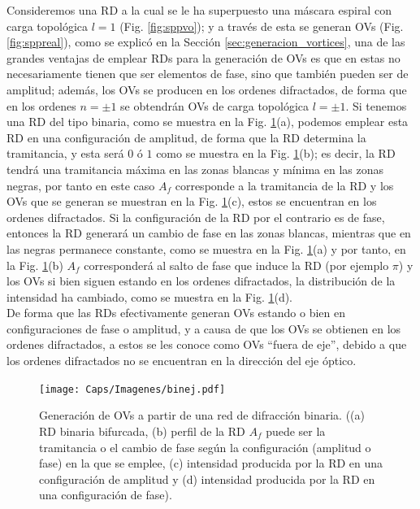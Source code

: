 Consideremos una RD a la cual se le ha superpuesto una máscara espiral con carga topológica $l=1$ (Fig. \ref{fig:sppvo}); y a través de esta se generan OVs (Fig. \ref{fig:sppreal}), como se explicó en la Sección \ref{sec:generacion_vortices}, una de las grandes ventajas de emplear RDs para la generación de OVs es que en estas no necesariamente tienen que ser elementos de fase, sino que también pueden ser de amplitud; además, los OVs se producen en los ordenes difractados, de forma que en los ordenes $n= \pm 1$ se obtendrán OVs de carga topológica $l=\pm 1$. Si tenemos una RD del tipo binaria, como se muestra en la Fig. \ref{fig:binej}(a), podemos emplear esta RD en una configuración de amplitud, de forma que la RD determina la tramitancia, y esta será $0$ ó $1$ como se muestra en la Fig. \ref{fig:binej}(b); es decir, la RD tendrá una tramitancia máxima en las zonas blancas y mínima en las zonas negras, por tanto en este caso $A_f$ corresponde a la tramitancia de la RD y los OVs que se generan se muestran en la Fig. \ref{fig:binej}(c), estos se encuentran en los ordenes difractados. Si la configuración de la RD por el contrario es de fase, entonces la RD generará un cambio de fase en las zonas blancas, mientras que en las negras permanece constante, como se muestra en la Fig. \ref{fig:binej}(a) y por tanto, en la Fig. \ref{fig:binej}(b) $A_f$ corresponderá al salto de fase que induce la RD (por ejemplo $\pi$) y los OVs si bien siguen estando en los ordenes difractados, la distribución de la intensidad ha cambiado, como se muestra en la Fig. \ref{fig:binej}(d). \\

De forma que las RDs efectivamente generan OVs estando o bien en configuraciones de fase o amplitud, y a causa de que los OVs se obtienen en los ordenes difractados, a estos se les conoce como OVs ``fuera de eje'', debido a que los ordenes difractados no se encuentran en la dirección del eje óptico.


\begin{figure}[!ht]
  \centering
    \texttt{[image: Caps/Imagenes/binej.pdf]}
  \caption[Generación de OVs a partir de una red de difracción binaria.]{Generación de OVs a partir de una red de difracción binaria. ((a) RD binaria bifurcada, (b) perfil de la RD $A_f$ puede ser la tramitancia o el cambio de fase según la configuración (amplitud o fase) en la que se emplee, (c) intensidad producida por la RD en una configuración de amplitud y (d) intensidad producida por la RD en una configuración de fase).}
  \label{fig:binej}
\end{figure}

